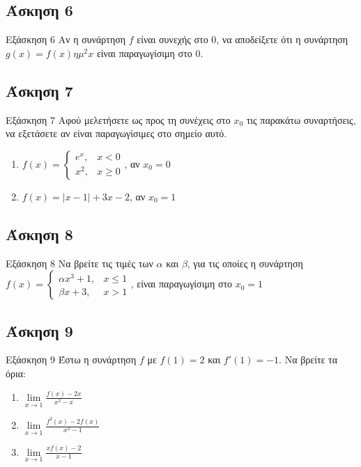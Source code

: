 \documentclass[greek]{beamer}
\begin{document}
\subsection{Άσκηση 6}
\begin{frame}[label=Άσκηση6]{Εξάσκηση 6}
 Αν η συνάρτηση $f$ είναι συνεχής στο $0$, να αποδείξετε ότι η συνάρτηση $g(x)=f(x)ημ^2x$ είναι παραγωγίσιμη στο $0$.

\end{frame}

\subsection{Άσκηση 7}
\begin{frame}{Εξάσκηση 7}
 Αφού μελετήσετε ως προς τη συνέχεις στο $x_0$ τις παρακάτω συναρτήσεις, να εξετάσετε αν είναι παραγωγίσιμες στο σημείο αυτό.
 \begin{enumerate}
  \item<1-> $f(x)=\begin{cases}
     e^x, & x<0    \\
     x^2, & x\ge 0
    \end{cases}$, αν $x_0=0$
  \item<2-> $f(x)=|x-1|+3x-2$, αν $x_0=1$
 \end{enumerate}
\end{frame}

\subsection{Άσκηση 8}
\begin{frame}{Εξάσκηση 8}
 Να βρείτε τις τιμές των $α$ και $β$, για τις οποίες η συνάρτηση
 $f(x)=\begin{cases}
   αx^3+1, & x\le 1 \\
   βx+3,   & x >1
  \end{cases}$, είναι παραγωγίσιμη στο $x_0=1$
\end{frame}

\subsection{Άσκηση 9}
\begin{frame}[label=Άσκηση9]{Εξάσκηση 9}
 Έστω η συνάρτηση $f$ με $f(1)=2$ και $f'(1)=-1$. Να βρείτε τα όρια:
 \begin{enumerate}
  \item<1-> $\lim\limits_{x \to 1}{ \frac{f(x)-2x}{x^2-x}}$
  \item<2-> $\lim\limits_{x \to 1}{ \frac{f^2(x)-2f(x)}{x^2-1}}$
  \item<3-> $\lim\limits_{x \to 1}{ \frac{xf(x)-2}{x-1}}$
 \end{enumerate}

\end{frame}
\end{document}
